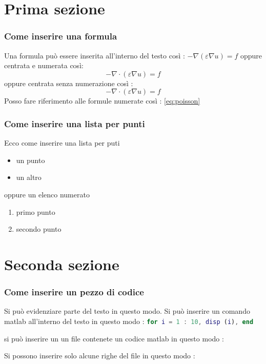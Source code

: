 \documentclass[10pt]{beamer}
\begin{document}
\section{Prima sezione}\label{sec:sec1}

\begin{frame} \frametitle{Come inserire una formula}
Una formula può essere inserita all'interno del testo così : 
$-\nabla \left( \varepsilon \nabla u \right) = f $ oppure 
centrata e numerata così:
\begin{equation}\label{eq:poisson}
    -\nabla \cdot \left( \varepsilon \nabla u \right) = f
\end{equation}
oppure centrata senza numerazione così :
$$
 -\nabla \cdot \left( \varepsilon \nabla u \right) = f
$$
Posso fare riferimento alle formule numerate così : \eqref{eq:poisson}
\end{frame}

\begin{frame} \frametitle{Come inserire una lista per punti}
Ecco come inserire una lista per puti
\begin{itemize}
    \item un punto
    \item un altro
\end{itemize}
oppure un elenco numerato
\begin{enumerate}
    \item primo punto
    \item secondo punto
\end{enumerate}

\end{frame}

\section{Seconda sezione}\label{sec:sec2}

\begin{frame} \frametitle{Come inserire un pezzo di codice}
Si può evidenziare \alert{parte del testo} in questo modo.
%
Si può inserire un comando matlab all'interno del testo
in questo modo : \lstinline[language=Matlab]{for i = 1 : 10, disp (i), end}

si può inserire un un file contenete un codice matlab in questo modo :


Si possono inserire solo alcune righe del file in questo modo :


\end{frame}
\end{document}
